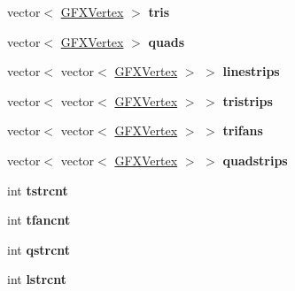 \begin{DoxyCompactItemize}
\item 
vector$<$ \hyperlink{structGFXVertex}{G\+F\+X\+Vertex} $>$ {\bfseries tris}\hypertarget{structMeshXML_a92e0d92bf3c2f948da042bd5da4277d0}{}\label{structMeshXML_a92e0d92bf3c2f948da042bd5da4277d0}

\item 
vector$<$ \hyperlink{structGFXVertex}{G\+F\+X\+Vertex} $>$ {\bfseries quads}\hypertarget{structMeshXML_a92ce5ad569004f21e67b7f92d00165a4}{}\label{structMeshXML_a92ce5ad569004f21e67b7f92d00165a4}

\item 
vector$<$ vector$<$ \hyperlink{structGFXVertex}{G\+F\+X\+Vertex} $>$ $>$ {\bfseries linestrips}\hypertarget{structMeshXML_acbb9e31b124f932e21e65c86a0fa60c4}{}\label{structMeshXML_acbb9e31b124f932e21e65c86a0fa60c4}

\item 
vector$<$ vector$<$ \hyperlink{structGFXVertex}{G\+F\+X\+Vertex} $>$ $>$ {\bfseries tristrips}\hypertarget{structMeshXML_a779f0c8bb3a5fc555b80f8a92bf31b7b}{}\label{structMeshXML_a779f0c8bb3a5fc555b80f8a92bf31b7b}

\item 
vector$<$ vector$<$ \hyperlink{structGFXVertex}{G\+F\+X\+Vertex} $>$ $>$ {\bfseries trifans}\hypertarget{structMeshXML_aa732e7f7fda96a234791de4be821b63a}{}\label{structMeshXML_aa732e7f7fda96a234791de4be821b63a}

\item 
vector$<$ vector$<$ \hyperlink{structGFXVertex}{G\+F\+X\+Vertex} $>$ $>$ {\bfseries quadstrips}\hypertarget{structMeshXML_a8635b44dfeed77d0672a2b630508868d}{}\label{structMeshXML_a8635b44dfeed77d0672a2b630508868d}

\item 
int {\bfseries tstrcnt}\hypertarget{structMeshXML_a6ef6982413602f826305d0ba21b62ad5}{}\label{structMeshXML_a6ef6982413602f826305d0ba21b62ad5}

\item 
int {\bfseries tfancnt}\hypertarget{structMeshXML_a307323fc08ab081dcb55236233649853}{}\label{structMeshXML_a307323fc08ab081dcb55236233649853}

\item 
int {\bfseries qstrcnt}\hypertarget{structMeshXML_a390622f9eefe3e0e3e7a501c95a068bd}{}\label{structMeshXML_a390622f9eefe3e0e3e7a501c95a068bd}

\item 
int {\bfseries lstrcnt}\hypertarget{structMeshXML_ab3e235a527a185822d170b4d636449a8}{}\label{structMeshXML_ab3e235a527a185822d170b4d636449a8}


\end{DoxyCompactItemize}
